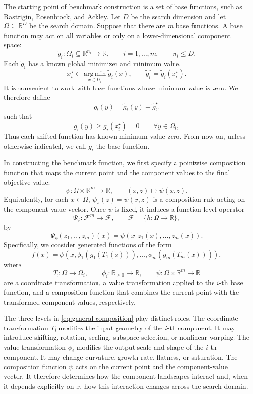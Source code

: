 \documentclass[journal]{IEEEtran}
\theoremstyle{remark}
\theoremstyle{plain}
\begin{document}
The starting point of benchmark construction is a set of base functions, such
as Rastrigin, Rosenbrock, and Ackley. Let \(D\) be the search dimension and let
\(\Omega\subseteq\mathbb{R}^D\) be the search domain. Suppose that there are
\(m\) base functions. A base function may act on all variables or only on a
lower-dimensional component space:
\[
\tilde g_i:\Omega_i\subseteq\mathbb{R}^{n_i}\to\mathbb{R},
\qquad i=1,\ldots,m,
\qquad n_i\le D.
\]
Each \(\tilde g_i\) has a known global minimizer and minimum value,
\[
x_i^\star\in\operatorname*{arg\,min}_{x\in\Omega_i}\tilde g_i(x),\qquad 
\tilde g_i^\star
=
\tilde g_i(x_i^\star).
\]
It is convenient to work with base functions whose minimum value is zero. We
therefore define
\[
g_i(y)
=
\tilde g_i(y)-\tilde g_i^\star.
\label{eq:bias-corrected-base}
\]
such that
\[
g_i(y)\ge g_i(x_i^\star) =0
\qquad\forall y\in\Omega_i,
\]
Thus each shifted function has known minimum value zero. From now on, unless
otherwise indicated, we call \(g_i\) the base function.

In constructing the benchmark function, we first specify a pointwise composition
function that maps the current point and the component values to the final
objective value:
\[
	\psi:\Omega\times\mathbb{R}^m\to\mathbb{R},
	\qquad
	(x,z)\mapsto \psi(x,z).
\]
Equivalently, for each \(x\in\Omega\), \(\psi_x(z)=\psi(x,z)\) is a
composition rule acting on the component-value vector. Once \(\psi\) is fixed,
it induces a function-level operator
\[
	\Psi_\psi:\mathcal{F}^m\to\mathcal{F},
	\qquad
	\mathcal{F}=\{h:\Omega\to\mathbb{R}\},
\]
by
\[
	\Psi_\psi(z_1,\ldots,z_m)(x)=\psi(x,z_1(x),\ldots,z_m(x)).
\]
Specifically, we consider generated functions of the form
\begin{equation}
\boxed{
	f(x)
	=
	\psi
	\left(
	x,
	\phi_1\!\left(g_1(T_1(x))\right),
	\ldots,
	\phi_m\!\left(g_m(T_m(x))\right)
	\right),
}
\label{eq:general-composition}
\end{equation}
where
\[
T_i:\Omega\to\Omega_i, \qquad
\phi_i:\mathbb{R}_{\ge0}\to\mathbb{R}, \qquad
\psi:\Omega\times\mathbb{R}^m\to\mathbb{R}
\]
are a coordinate transformation, a value transformation applied to the \(i\)-th
base function, and a composition function that combines the current point with
the transformed component values, respectively.

The three levels in \eqref{eq:general-composition} play distinct roles. The
coordinate transformation $T_i$ modifies the input geometry of the $i$-th
component. It may introduce shifting, rotation, scaling, subspace selection,
or nonlinear warping. The value transformation $\phi_i$ modifies the output
scale and shape of the $i$-th component. It may change curvature, growth rate,
flatness, or saturation. The composition function $\psi$ acts on the current
point and the component-value vector. It therefore determines how the component
landscapes interact and, when it depends explicitly on \(x\), how this
interaction changes across the search domain.
\end{document}

